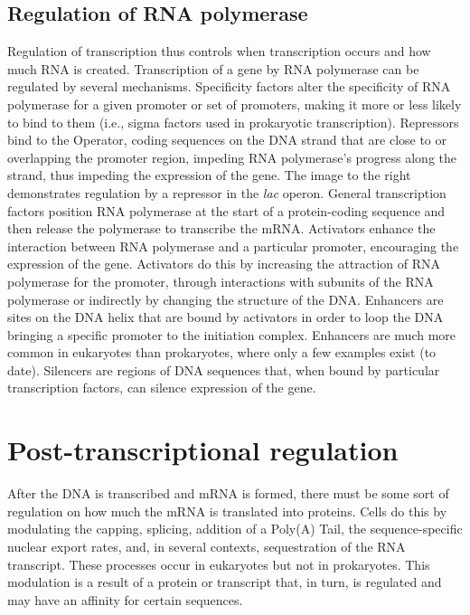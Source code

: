 \hypertarget{regulation-of-rna-polymerase}{%
\subsection{Regulation of RNA polymerase}\label{regulation-of-rna-polymerase}}

Regulation of transcription thus controls when transcription occurs and how much RNA is created. Transcription of a gene by RNA polymerase can be regulated by several mechanisms. Specificity factors alter the specificity of RNA polymerase for a given promoter or set of promoters, making it more or less likely to bind to them (i.e., sigma factors used in prokaryotic transcription). Repressors bind to the Operator, coding sequences on the DNA strand that are close to or overlapping the promoter region, impeding RNA polymerase's progress along the strand, thus impeding the expression of the gene. The image to the right demonstrates regulation by a repressor in the \emph{lac} operon. General transcription factors position RNA polymerase at the start of a protein-coding sequence and then release the polymerase to transcribe the mRNA. Activators enhance the interaction between RNA polymerase and a particular promoter, encouraging the expression of the gene. Activators do this by increasing the attraction of RNA polymerase for the promoter, through interactions with subunits of the RNA polymerase or indirectly by changing the structure of the DNA. Enhancers are sites on the DNA helix that are bound by activators in order to loop the DNA bringing a specific promoter to the initiation complex. Enhancers are much more common in eukaryotes than prokaryotes, where only a few examples exist (to date). Silencers are regions of DNA sequences that, when bound by particular transcription factors, can silence expression of the gene.

\hypertarget{post-transcriptional-regulation}{%
\section{Post-transcriptional regulation}\label{post-transcriptional-regulation}}

After the DNA is transcribed and mRNA is formed, there must be some sort of regulation on how much the mRNA is translated into proteins. Cells do this by modulating the capping, splicing, addition of a Poly(A) Tail, the sequence-specific nuclear export rates, and, in several contexts, sequestration of the RNA transcript. These processes occur in eukaryotes but not in prokaryotes. This modulation is a result of a protein or transcript that, in turn, is regulated and may have an affinity for certain sequences.


